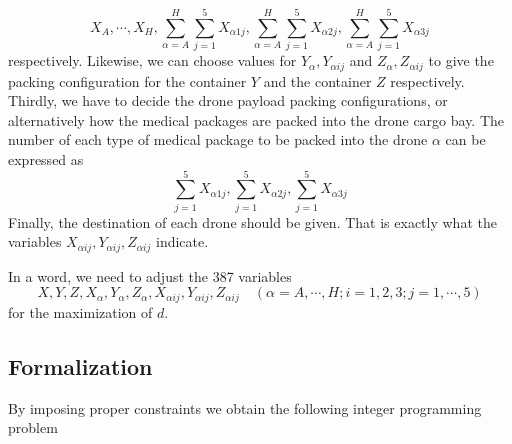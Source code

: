 \documentclass{mcmthesis}
\begin{document}
\begin{equation*}
	X_A,\cdots,X_H,\sum_{\alpha=A}^H\sum_{j=1}^{5}X_{\alpha 1j},\sum_{\alpha=A}^H\sum_{j=1}^{5}X_{\alpha 2j},\sum_{\alpha=A}^H\sum_{j=1}^{5}X_{\alpha 3j}
\end{equation*} 
respectively. Likewise, we can choose values for $Y_\alpha,Y_{\alpha ij}$ and $Z_{\alpha},Z_{\alpha ij}$ to give the packing configuration for the container $Y$ and the container $Z$ respectively. Thirdly, we have to decide the drone payload packing configurations, or alternatively how the medical packages are packed into the drone cargo bay. The number of each type of medical package to be packed into the drone $\alpha$ can be expressed as
\begin{equation*}
\sum_{j=1}^{5}X_{\alpha 1j},\sum_{j=1}^{5}X_{\alpha 2j},\sum_{j=1}^{5}X_{\alpha 3j}
\end{equation*} Finally, the destination of each drone should be given. That is exactly what the variables $X_{\alpha ij},Y_{\alpha ij},Z_{\alpha ij}$ indicate. 

\noindent In a word, we need to adjust the 387 variables
\[
X,Y,Z,X_{\alpha},Y_{\alpha},Z_{\alpha},X_{\alpha ij},Y_{\alpha ij},Z_{\alpha ij}\quad(\alpha=A,\cdots,H;i=1,2,3;j=1,\cdots,5)
\]
for the maximization of $d$.

\subsection{Formalization}

\noindent By imposing proper constraints we obtain the following integer programming problem
\end{document}
